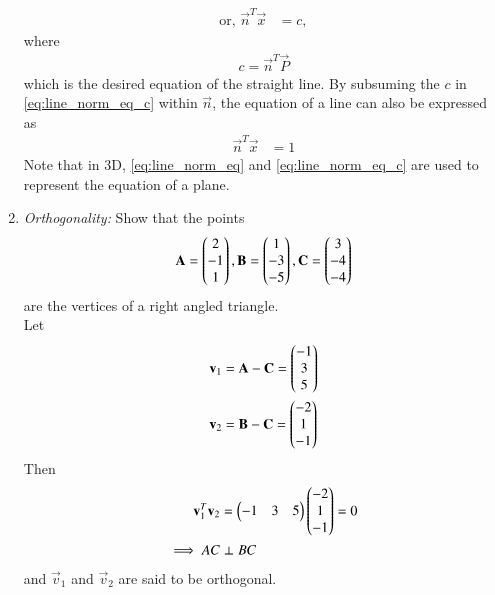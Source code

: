\begin{enumerate}[label=\thesection.\arabic*.,ref=\thesection.\theenumi]
\begin{align}
\\
\text{or, } \vec{n}^T\vec{x} &= c,
\label{eq:line_norm_eq_c}
\end{align}
%
where
\begin{align}
c = \vec{n}^T\vec{P}
\end{align}
which is the desired  equation of the straight line.  By subsuming the $c$ in \eqref{eq:line_norm_eq_c} within $\vec{n}$, the equation of a line can also be expressed as
\begin{align}
\label{eq:line_norm_eq_unit}
\vec{n}^T\vec{x} &= 1
\end{align}
%
Note that in 3D, \eqref{eq:line_norm_eq} and \eqref{eq:line_norm_eq_c} are used to represent the equation of a plane. 

\item {\em Orthogonality: }Show that the points
\begin{align}
\mathbf{A} = \begin{pmatrix}2\\-1\\1\end{pmatrix}, 
\mathbf{B} = \begin{pmatrix}1\\-3\\-5\end{pmatrix}, 
\mathbf{C} = \begin{pmatrix}3\\-4\\-4\end{pmatrix} 
\end{align}
%
are the vertices of a right angled triangle.
\\
\solution Let 
\begin{align}
\mathbf{v}_1 &= \mathbf{A}-\mathbf{C} = \begin{pmatrix}-1\\3\\5\end{pmatrix} 
\\
\mathbf{v}_2 &= \mathbf{B}-\mathbf{C} = \begin{pmatrix}-2\\1\\-1\end{pmatrix} 
\end{align}
Then 
\begin{align}
\mathbf{v}_1^T\mathbf{v}_2  &=  \begin{pmatrix}-1&3&5\end{pmatrix}  \begin{pmatrix}-2\\1\\-1\end{pmatrix} =0
\\
\implies AC &\perp BC
\end{align}
and $\vec{v}_1$ and $\vec{v}_2$ are said to be orthogonal. 


\end{enumerate}
